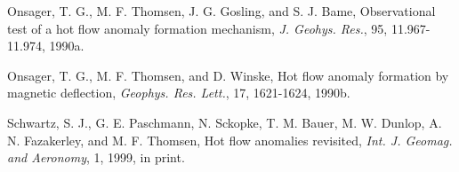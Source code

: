 \documentclass{article}
\begin{document}
\begin{article}
\begin{references}

Onsager, T. G., M. F. Thomsen, J. G. Gosling, and S. J.
Bame, Observational test of a hot flow anomaly formation
mechanism, {\it J. Geohys. Res.}, 95, 11.967-11.974, 1990a.

Onsager, T. G., M. F. Thomsen, and D. Winske,
Hot flow anomaly formation by magnetic deflection,
{\it Geophys. Res. Lett.}, 17, 1621-1624, 1990b.

Schwartz, S. J., G. E. Paschmann, N. Sckopke, T. M. Bauer, M. W.
Dunlop, A. N. Fazakerley, and M. F. Thomsen,  Hot flow anomalies
revisited, {\it Int. J. Geomag. and Aeronomy}, 1, 1999, in print.

\end{references}







\end{article}
\end{document}

